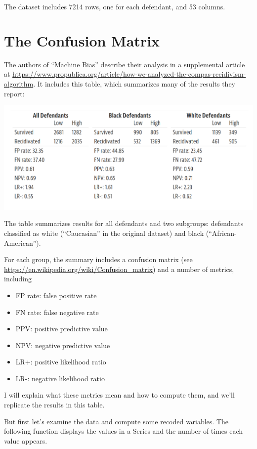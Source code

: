 The dataset includes 7214 rows, one for each defendant, and 53 columns.

\hypertarget{the-confusion-matrix}{%
\section{The Confusion Matrix}\label{the-confusion-matrix}}

The authors of ``Machine Bias'' describe their analysis in a
supplemental article at
\url{https://www.propublica.org/article/how-we-analyzed-the-compas-recidivism-algorithm}.
It includes this table, which summarizes many of the results they
report:

\includegraphics{figs/machine_bias_table.png}

The table summarizes results for all defendants and two subgroups:
defendants classified as white (``Caucasian'' in the original dataset)
and black (``African-American'').

For each group, the summary includes a confusion matrix (see
\url{https://en.wikipedia.org/wiki/Confusion_matrix}) and a number of
metrics, including

\begin{itemize}

\item
  FP rate: false positive rate
\item
  FN rate: false negative rate
\item
  PPV: positive predictive value
\item
  NPV: negative predictive value
\item
  LR+: positive likelihood ratio
\item
  LR-: negative likelihood ratio
\end{itemize}

I will explain what these metrics mean and how to compute them, and
we'll replicate the results in this table.

But first let's examine the data and compute some recoded variables. The
following function displays the values in a Series and the number of
times each value appears.

